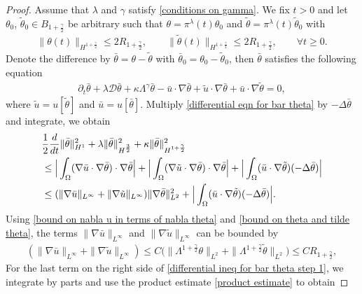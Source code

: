\documentclass[reqno]{amsart}%
\theoremstyle{definition}
\theoremstyle{remark}
\numberwithin{equation}{section}
\newcommand{\dt}{\partial_t}
\newcommand{\1}{\mathbf{1}}
\newcommand{\pin}{\pi^{\lambda}}
\newcommand{\intox}{\int_{\Omega}}
\numberwithin{equation}{section}
\numberwithin{theorem}{section}
\numberwithin{figure}{section}
\begin{document}
\begin{proof}
Assume that $\lambda$ and $\gamma$ satisfy \eqref{conditions on gamma}. We fix $t>0$ and let $\theta_0$, $\tilde\theta_0\in B_{1+\frac{\gamma}{2}}$ be arbitrary such that $\theta=\pin(t)\theta_0$ and $\tilde\theta=\pin(t)\tilde\theta_0$ with
\begin{align}\label{bound on theta and tilde theta}
\|\theta(t)\|_{H^{1+\frac{\gamma}{2}}}\le 2R_{1+\frac{\gamma}{2}}, \qquad\|\tilde\theta(t)\|_{H^{1+\frac{\gamma}{2}}}\le 2R_{1+\frac{\gamma}{2}},\qquad\forall t\ge0.
\end{align}
Denote the difference by $\bar{\theta}=\theta-\tilde\theta$ with $\bar{\theta}_0=\theta_0-\tilde\theta_0$, then $\bar{\theta}$ satisfies the following equation
\begin{align}\label{differential eqn for bar theta}
\dt\bar{\theta}+\lambda\mathcal{D}\bar{\theta}+\kappa\Lambda^\gamma\bar{\theta}-\bar{u}\cdot\nabla\bar{\theta}+\tilde u\cdot\nabla\bar{\theta}+\bar{u}\cdot\nabla\tilde\theta=0,
\end{align}
where $\tilde u=u[\tilde\theta]$ and $\bar{u}=u[\bar{\theta}]$. Multiply \eqref{differential eqn for bar theta} by $-\Delta\bar{\theta}$ and integrate, we obtain
\begin{align}\label{differential ineq for bar theta step 1}
&\frac{1}{2}\frac{d}{dt}\|\bar\theta\|^2_{H^1}+\lambda\|\bar\theta\|^2_{H^{\frac{3}{2}}}+\kappa\|\bar\theta\|^2_{H^{1+\frac{\gamma}{2}}}\notag\\
&\le\Big|\intox(\nabla\bar{u}\cdot\nabla\bar{\theta})\cdot\nabla\bar{\theta}\Big|+\Big|\intox(\nabla\tilde u\cdot\nabla\bar{\theta})\cdot\nabla\bar{\theta}\Big|+\Big|\intox(\bar{u}\cdot\nabla\tilde\theta)(-\Delta\bar{\theta})\Big|\notag\\
&\le(\|\nabla\bar{u}\|_{L^\infty}+\|\nabla\tilde{u}\|_{L^\infty})\|\nabla\bar{\theta}\|^2_{L^2}+\Big|\intox(\bar{u}\cdot\nabla\tilde\theta)(-\Delta\bar{\theta})\Big|.
\end{align}
Using \eqref{bound on nabla u in terms of nabla theta} and \eqref{bound on theta and tilde theta}, the terms $\|\nabla\bar{u}\|_{L^\infty}$ and $\|\nabla\tilde{u}\|_{L^\infty}$ can be bounded by
\begin{align*}
(\|\nabla\bar{u}\|_{L^\infty}+\|\nabla\tilde{u}\|_{L^\infty})\le C\Big(\|\Lambda^{1+\frac{\gamma}{2}}\theta\|_{L^2}+\|\Lambda^{1+\frac{\gamma}{2}}\tilde\theta\|_{L^2}\Big)\le CR_{1+\frac{\gamma}{2}},
\end{align*}
For the last term on the right side of \eqref{differential ineq for bar theta step 1}, we integrate by parts and use the product estimate \eqref{product estimate} to obtain

\end{proof}
\end{document}

